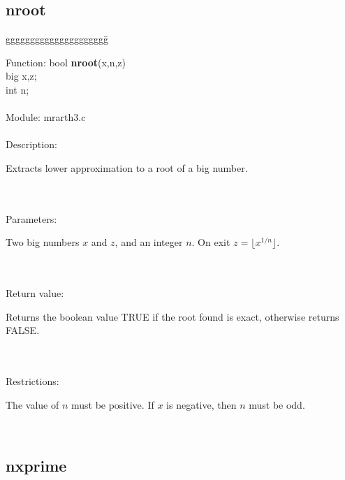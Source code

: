\subsection{nroot}

\begin{tabbing}
ggggggggggggggggggggg\= \kill

      Function:      \>bool {\bf nroot}(x,n,z) \\
                     \>big x,z; \\
                     \>int n; \\
      \ \\
      Module:        \>mrarth3.c \\
      \ \\
      Description:   \>
                     \parbox[t]{3 in}
                     {Extracts lower approximation to a root of a big number.}\\
      \ \\
      Parameters:    \>
                     \parbox[t]{3 in}
                     {Two big numbers $x$ and $z$, and an integer $n$.
                     On exit $z=\lfloor x^{1/n} \rfloor $.} \\
      \ \\
      Return value:  \>
                     \parbox[t]{3 in}
                     {Returns the boolean value TRUE if the root found is 
                     exact, otherwise returns FALSE.} \\
      \ \\
      Restrictions:  \>
                     \parbox[t]{3 in}
                     {The value of $n$ must be positive. If $x$ is negative, 
                      then $n$ must be odd.} \\

\end{tabbing}
\subsection{nxprime}

